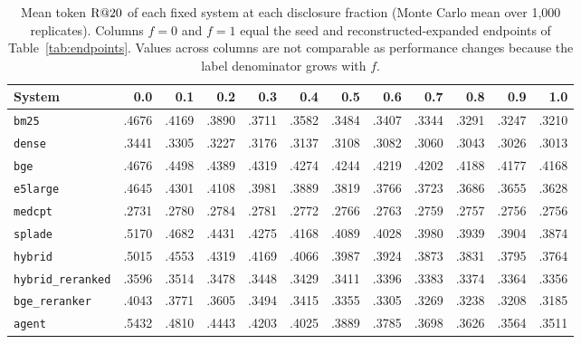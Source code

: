 \begin{table}[h]
\centering
\small
\caption{Mean token $\mathrm{R}@20$ of each fixed system at each disclosure fraction (Monte Carlo mean over 1,000 replicates). Columns $f=0$ and $f=1$ equal the seed and reconstructed-expanded endpoints of Table~\ref{tab:endpoints}. Values across columns are not comparable as performance changes because the label denominator grows with $f$.}
\label{tab:gridmeans}
\setlength{\tabcolsep}{3.6pt}
\begin{tabular}{@{}lrrrrrrrrrrr@{}}
\toprule
System & 0.0 & 0.1 & 0.2 & 0.3 & 0.4 & 0.5 & 0.6 & 0.7 & 0.8 & 0.9 & 1.0 \\
\midrule
\texttt{bm25} & .4676 & .4169 & .3890 & .3711 & .3582 & .3484 & .3407 & .3344 & .3291 & .3247 & .3210 \\
\texttt{dense} & .3441 & .3305 & .3227 & .3176 & .3137 & .3108 & .3082 & .3060 & .3043 & .3026 & .3013 \\
\texttt{bge} & .4676 & .4498 & .4389 & .4319 & .4274 & .4244 & .4219 & .4202 & .4188 & .4177 & .4168 \\
\texttt{e5large} & .4645 & .4301 & .4108 & .3981 & .3889 & .3819 & .3766 & .3723 & .3686 & .3655 & .3628 \\
\texttt{medcpt} & .2731 & .2780 & .2784 & .2781 & .2772 & .2766 & .2763 & .2759 & .2757 & .2756 & .2756 \\
\texttt{splade} & .5170 & .4682 & .4431 & .4275 & .4168 & .4089 & .4028 & .3980 & .3939 & .3904 & .3874 \\
\texttt{hybrid} & .5015 & .4553 & .4319 & .4169 & .4066 & .3987 & .3924 & .3873 & .3831 & .3795 & .3764 \\
\texttt{hybrid\_reranked} & .3596 & .3514 & .3478 & .3448 & .3429 & .3411 & .3396 & .3383 & .3374 & .3364 & .3356 \\
\texttt{bge\_reranker} & .4043 & .3771 & .3605 & .3494 & .3415 & .3355 & .3305 & .3269 & .3238 & .3208 & .3185 \\
\texttt{agent} & .5432 & .4810 & .4443 & .4203 & .4025 & .3889 & .3785 & .3698 & .3626 & .3564 & .3511 \\
\bottomrule
\end{tabular}
\end{table}

